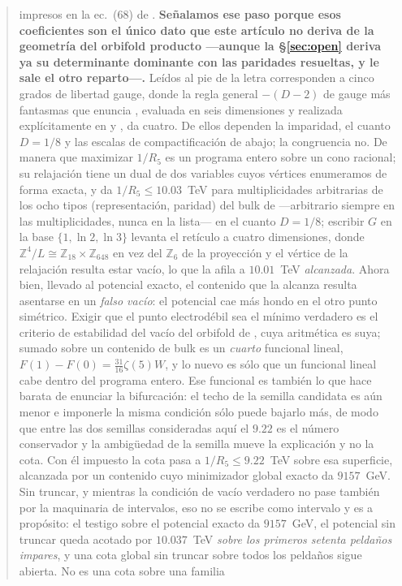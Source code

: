 \documentclass[11pt,a4paper]{article}
\newcommand{\ZZ}{\mathbb{Z}}
\begin{document}
\begin{abstract}
impresos en la ec.~(68) de \cite{KM25}. \textbf{Señalamos ese paso porque esos coeficientes son el
único dato que este artículo no deriva de la geometría del orbifold producto ---aunque la
\S\ref{sec:open} deriva ya su determinante dominante con las paridades resueltas, y le sale el
otro reparto---.} Leídos al pie de la letra corresponden a cinco grados de
libertad gauge, donde la regla general $-(D-2)$ de gauge más fantasmas que enuncia \cite{HY04},
evaluada en seis dimensiones y realizada explícitamente en \cite{HNT} y \cite{AHMN}, da cuatro.
De ellos dependen la imparidad, el cuanto $D=1/8$ y las escalas de compactificación de abajo; la
congruencia no. De manera que maximizar $1/R_5$ es un programa entero sobre un cono
racional; su relajación tiene un dual de dos variables cuyos vértices enumeramos de forma exacta, y
da $1/R_5 \le 10.03$~TeV para multiplicidades arbitrarias de los ocho tipos (representación,
paridad) del bulk de \cite{KM25} ---arbitrario siempre en las multiplicidades, nunca en la
lista--- en el cuanto $D=1/8$; escribir $G$ en la
base $\{1,\ln2,\ln3\}$ levanta el retículo a cuatro dimensiones, donde
$\ZZ^4/L\cong\ZZ_{18}\times\ZZ_{648}$ en vez del $\ZZ_6$ de la proyección y el vértice de la
relajación resulta estar vacío, lo que la afila a
$10.01$~TeV \emph{alcanzada}. Ahora bien, llevado al potencial exacto, el contenido que la alcanza
resulta asentarse en un \emph{falso vacío}: el potencial cae más hondo en el otro punto simétrico.
Exigir que el punto electrodébil sea el mínimo verdadero es el criterio de estabilidad del vacío del orbifold
de \cite{CCD24}, cuya aritmética es suya; sumado sobre un contenido de bulk es un \emph{cuarto}
funcional lineal, $F(1)-F(0)=\tfrac{31}{16}\zeta(5)W$, y lo nuevo es sólo que un funcional lineal
cabe dentro del programa entero. Ese funcional es también lo que hace barata de enunciar la bifurcación: el techo de la semilla
candidata es aún menor e imponerle la misma condición sólo puede bajarlo más, de modo que entre
las dos semillas consideradas aquí el $9.22$ es el número conservador y la ambigüedad de la
semilla mueve la explicación y no la cota. Con él impuesto la cota pasa a $1/R_5 \le 9.22$~TeV sobre esa
superficie, alcanzada por un contenido cuyo minimizador global exacto da $9157$~GeV. Sin truncar, y
mientras la condición de vacío verdadero no pase también por la maquinaria de intervalos, eso no se
escribe como intervalo y es a propósito: el testigo sobre el potencial exacto da $9157$~GeV, el
potencial sin truncar queda acotado por $10.037$~TeV \emph{sobre los primeros setenta peldaños
impares}, y una cota global sin truncar sobre todos los peldaños sigue abierta. No es una cota sobre una familia

\end{abstract}
\end{document}
